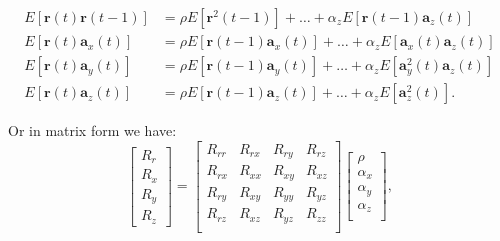\begin{footnotesize}
\begin{align}
\label{eq:model_5}
E \left [ \mathbf{r} (t) \mathbf{r} (t-1) \right ]  & = \rho E \left [ \mathbf{r}^2(t-1) \right ] + \dots + \alpha_z E \left [ \mathbf{r} (t -1) \mathbf{a}_z (t) \right] \\ \nonumber
E \left [ \mathbf{r} (t) \mathbf{a}_x (t) \right ]  & = \rho E \left [ \mathbf{r}(t-1) \mathbf{a}_x (t) \right ] + \dots + \alpha_z E \left [ \mathbf{a}_x (t) \mathbf{a}_z (t) \right] \\ \nonumber
E \left [ \mathbf{r} (t) \mathbf{a}_y (t) \right ]  & = \rho E \left [ \mathbf{r}(t-1) \mathbf{a}_y (t) \right ] + \dots + \alpha_z E \left [ \mathbf{a}^2_y (t) \mathbf{a}_z (t) \right] \\ \nonumber
E \left [ \mathbf{r} (t) \mathbf{a}_z (t) \right ]  & = \rho E \left [ \mathbf{r}(t-1) \mathbf{a}_z (t) \right ] + \dots + \alpha_z E \left [ \mathbf{a}^2_z (t) \right]. 
\end{align}
\end{footnotesize}
Or in matrix form we have:
\begin{equation}
    \label{eq:model_6b}
    \begin{bmatrix}
    R_{r} \\
    R_{x} \\
    R_{y} \\
    R_{z} 
    \end{bmatrix}
     = 
     \begin{bmatrix}
         R_{rr} & R_{rx} & R_{ry}  & R_{rz} \\ 
         R_{rx} & R_{xx} & R_{xy}  & R_{xz} \\ 
         R_{ry} & R_{xy} & R_{yy}  & R_{yz} \\ 
         R_{rz} & R_{xz} & R_{yz}  & R_{zz} \\ 
     \end{bmatrix}
     \begin{bmatrix}
         \rho \\
         \alpha_x \\
         \alpha_y \\
         \alpha_z \\
     \end{bmatrix},
\end{equation}
